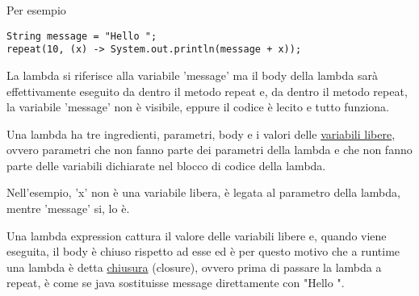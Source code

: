 Per esempio
\begin{lstlisting}
String message = "Hello ";
repeat(10, (x) -> System.out.println(message + x));
\end{lstlisting}

La lambda si riferisce alla variabile 'message' ma il body della lambda sarà effettivamente eseguito da dentro il metodo repeat e, da dentro il metodo repeat, la 
variabile 'message' non è visibile, eppure il codice è lecito e tutto funziona.

Una lambda ha tre ingredienti, parametri, body e i valori delle \underline{variabili libere}, ovvero parametri che non fanno parte dei parametri della lambda e che non
fanno parte delle variabili dichiarate nel blocco di codice della lambda.

Nell'esempio, 'x' non è una variabile libera, è legata al parametro della lambda, mentre 'message' si, lo è.

Una lambda expression cattura il valore delle variabili libere e, quando viene eseguita, il body è chiuso rispetto ad esse ed è per questo motivo che a runtime una
lambda è detta \underline{chiusura} (closure), ovvero prima di passare la lambda a repeat, è come se java sostituisse message direttamente con "Hello ".









